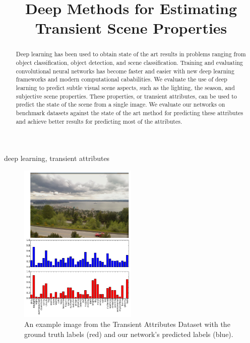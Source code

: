 \documentclass{article}
\title{Deep Methods for Estimating Transient Scene Properties}
\begin{document}
%
\maketitle
%
\begin{abstract}
	
	Deep learning has been used to obtain state of the art results in
  problems ranging from object classification, object detection, and
  scene classification.  Training and evaluating convolutional neural
	networks has become faster and easier with new deep learning 
	frameworks and modern computational cababilities.  We evaluate the 
	use of deep learning to predict subtle visual scene aspects, such as
	the lighting, the season, and subjective scene properties. These
	properties, or transient attributes, can be used to predict the 
	state of the scene from a single image.  We evaluate our networks
	on benchmark datasets against the state of the art method for 
	predicting these attributes and achieve better results for predicting
	most of the attributes.

\end{abstract}
%
\begin{keywords}
	deep learning, transient attributes
\end{keywords}

\begin{figure}[t!]
	\centering
		\includegraphics[width=0.5\textwidth]{figs/bars.pdf}
		\caption{An example image from the Transient Attributes Dataset with the ground truth labels
						 (red) and our network's predicted labels (blue).}\label{fig:sort}
\end{figure}
\end{document}
